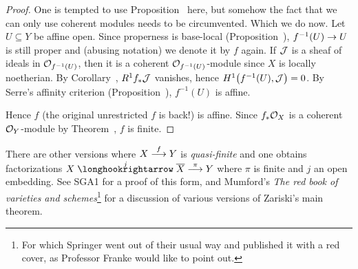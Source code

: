 \documentclass[a4paper,parskip=half,numbers=enddot, DIV=12]{scrreprt}
\begin{document}
\begin{proof}
	One is tempted to use Proposition~ here, but somehow the fact that we can only use coherent modules needs to be circumvented. Which we do now. Let $U\subseteq Y$ be affine open. Since properness is base-local (Proposition~), $f^{-1}(U)\morphism U$ is still proper and (abusing notation) we denote it by $f$ again. If $\mathcal{J}$ is a sheaf of ideals in $\mathcal{O}_{f^{-1}(U)}$, then it is a coherent $\mathcal{O}_{f^{-1}(U)}$-module since $X$ is locally noetherian. By Corollary~, $R^1f_*\mathcal{J}$ vanishes, hence $H^1\big(f^{-1}(U),\mathcal{J}\big)=0$. By Serre's affinity criterion (Proposition~), $f^{-1}(U)$ is affine.
	
	Hence $f$ (the original unrestricted $f$ is back!) is affine. Since $f_*\mathcal{O}_X$ is a coherent $\mathcal{O}_Y$-module by Theorem~, $f$ is finite.
\end{proof}
\begin{rem*}
	There are other versions where $X\morphism[f]Y$ is \emph{quasi-finite} and one obtains factorizations $X\monomorphism[j]\ov{X}\morphism[\pi]Y$ where $\pi$ is finite and $j$ an open embedding. See SGA1 for a proof of this form, and Mumford's \emph{The red book of varieties and schemes}\footnote{For which Springer went out of their usual way and published it with a red cover, as Professor Franke would like to point out.} for a discussion of various versions of Zariski's main theorem.
\end{rem*}
\end{document}
